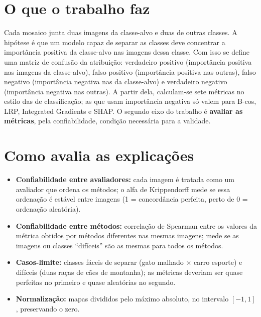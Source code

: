 \documentclass[11pt,a4paper]{article}
\begin{document}
\section{O que o trabalho faz}
Cada mosaico junta duas imagens da classe-alvo e duas de outras classes. A hipótese é que um modelo capaz de separar as classes deve concentrar a importância positiva da classe-alvo nas imagens dessa classe. Com isso se define uma matriz de confusão da atribuição: verdadeiro positivo (importância positiva nas imagens da classe-alvo), falso positivo (importância positiva nas outras), falso negativo (importância negativa nas da classe-alvo) e verdadeiro negativo (importância negativa nas outras). A partir dela, calculam-se sete métricas no estilo das de classificação; as que usam importância negativa só valem para B-cos, LRP, Integrated Gradients e SHAP. O segundo eixo do trabalho é \textbf{avaliar as métricas}, pela confiabilidade, condição necessária para a validade.

\section{Como avalia as explicações}
\begin{itemize}
  \item \textbf{Confiabilidade entre avaliadores:} cada imagem é tratada como um avaliador que ordena os métodos; o alfa de Krippendorff mede se essa ordenação é estável entre imagens (1 = concordância perfeita, perto de 0 = ordenação aleatória).
  \item \textbf{Confiabilidade entre métodos:} correlação de Spearman entre os valores da métrica obtidos por métodos diferentes nas mesmas imagens; mede se as imagens ou classes “difíceis” são as mesmas para todos os métodos.
  \item \textbf{Casos-limite:} classes fáceis de separar (gato malhado $\times$ carro esporte) e difíceis (duas raças de cães de montanha); as métricas deveriam ser quase perfeitas no primeiro e quase aleatórias no segundo.
  \item \textbf{Normalização:} mapas divididos pelo máximo absoluto, no intervalo $[-1, 1]$, preservando o zero.
\end{itemize}
\end{document}
